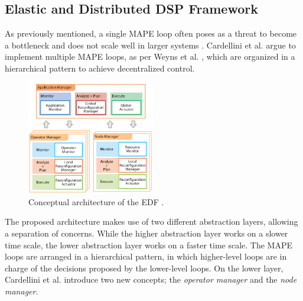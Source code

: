         \subsection{Elastic and Distributed DSP Framework}
        \label{sub:edf}
        As previously mentioned, a single MAPE loop often poses as a threat to become a bottleneck and does not scale well in larger systems \cite{cardellini}\cite{Cheng:2009:SES:1573856.1573858}.
        Cardellini et al. argue to implement multiple MAPE loops, as per Weyns et al. \cite{Weyns2013}, which are organized in a hierarchical pattern to achieve decentralized control.
        \begin{figure}[hbt]
            \centering
            \includegraphics[width=0.5\textwidth]{Bilder/hierarchical.png}
            \caption{
                    Conceptual architecture of the EDF \cite{cardellini}.
            }
            \label{fig:hierarchical}
        \end{figure}
        The proposed architecture makes use of two different abstraction layers, allowing a separation of concerns. 
        While the higher abstraction layer works on a slower time scale, the lower abstraction layer works on a faster time scale.
        The MAPE loops are arranged in a hierarchical pattern, in which higher-level loops are in charge of the decisions proposed by the lower-level loops.
        On the lower layer, Cardellini et al. introduce two new concepts; the \textit{operator manager} and the \textit{node manager}.

